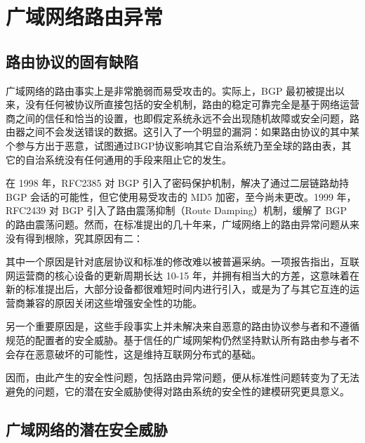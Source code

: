 \section{广域网络路由异常}

\subsection{路由协议的固有缺陷}

广域网络的路由事实上是非常脆弱而易受攻击的。实际上，BGP 最初被提出以来，没有任何被协议所直接包括的安全机制，路由的稳定可靠完全是基于网络运营商之间的信任和恰当的设置，也即假定系统永远不会出现随机故障或安全问题，路由器之间不会发送错误的数据。这引入了一个明显的漏洞：如果路由协议的其中某个参与方出于恶意，试图通过BGP协议影响其它自治系统乃至全球的路由表，其它的自治系统没有任何通用的手段来阻止它的发生。

在 1998 年，RFC2385 对 BGP 引入了密码保护机制，解决了通过二层链路劫持 BGP 会话的可能性，但它使用易受攻击的 MD5 加密，至今尚未更改。1999 年，RFC2439 对 BGP 引入了路由震荡抑制（Route Damping）机制，缓解了 BGP 的路由震荡问题。然而，在标准提出的几十年来，广域网络上的路由异常问题从来没有得到根除，究其原因有二：

其中一个原因是针对底层协议和标准的修改难以被普遍采纳。一项报告指出，互联网运营商的核心设备的更新周期长达 10-15 年，并拥有相当大的方差，这意味着在新的标准提出后，大部分设备都很难短时间内进行引入，或是为了与其它互连的运营商兼容的原因关闭这些增强安全性的功能。

另一个重要原因是，这些手段事实上并未解决来自恶意的路由协议参与者和不遵循规范的配置者的安全威胁。基于信任的广域网架构仍然坚持默认所有路由参与者不会存在恶意破坏的可能性，这是维持互联网分布式的基础。

因而，由此产生的安全性问题，包括路由异常问题，便从标准性问题转变为了无法避免的问题，它的潜在安全威胁使得对路由系统的安全性的建模研究更具意义。

\subsection{广域网络的潜在安全威胁}


